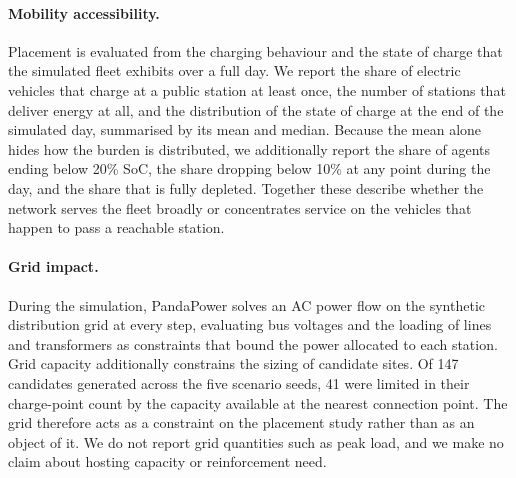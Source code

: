 \paragraph{Mobility accessibility.} Placement is evaluated from the charging behaviour and the state of charge that the simulated fleet exhibits over a full day. We report the share of electric vehicles that charge at a public station at least once, the number of stations that deliver energy at all, and the distribution of the state of charge at the end of the simulated day, summarised by its mean and median. Because the mean alone hides how the burden is distributed, we additionally report the share of agents ending below 20\% \ac{SoC}, the share dropping below 10\% at any point during the day, and the share that is fully depleted. Together these describe whether the network serves the fleet broadly or concentrates service on the vehicles that happen to pass a reachable station.

\paragraph{Grid impact.} During the simulation, PandaPower solves an \ac{AC} power flow on the synthetic distribution grid at every step, evaluating bus voltages and the loading of lines and transformers as constraints that bound the power allocated to each station. Grid capacity additionally constrains the sizing of candidate sites. Of 147 candidates generated across the five scenario seeds, 41 were limited in their charge-point count by the capacity available at the nearest connection point. The grid therefore acts as a constraint on the placement study rather than as an object of it. We do not report grid quantities such as peak load, and we make no claim about hosting capacity or reinforcement need.